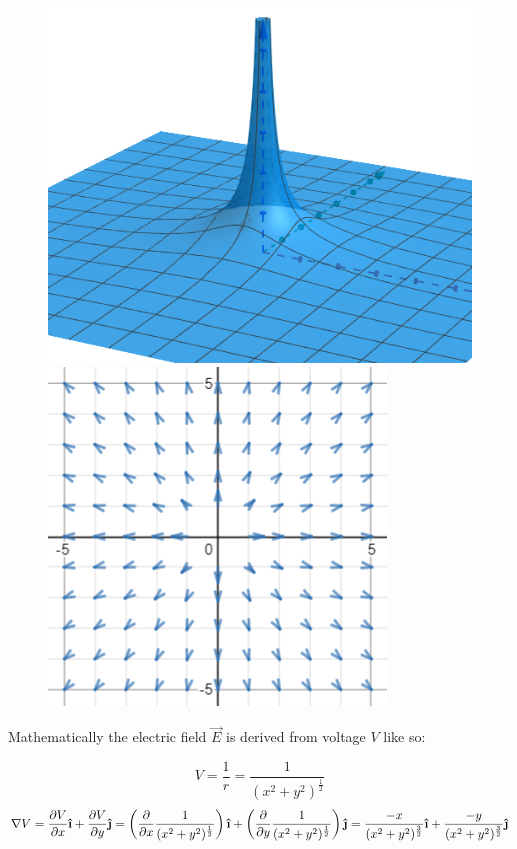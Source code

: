 \documentclass[11pt]{article}
\newcommand{\ihat}{\boldsymbol{\hat{\textbf{\i}}}}
\newcommand{\jhat}{\boldsymbol{\hat{\textbf{\j}}}}
\begin{document}
\begin{figure}[h]
\centering
\includegraphics[scale=0.57]{voltagepart1}
\includegraphics[scale=.75]{voltagepart2}
\end{figure}

Mathematically the electric field $\vec{E}$ is derived from voltage $V$ like so:

$$V = \frac{1}{r} = \frac{1}{(x^2+y^2)^{\frac{1}{2}}}$$
$$\nabla V = \pdv{V}{x}\ihat + \pdv{V}{y}\jhat = \left(\pdv{}{x} \frac{1}{(x^2+y^2)^{\frac{1}{2}}}\right) \ihat + \left(\pdv{}{y} \frac{1}{(x^2+y^2)^{\frac{1}{2}}}\right) \jhat = \frac{-x}{(x^2+y^2)^\frac{3}{2}} \ihat + \frac{-y}{(x^2+y^2)^\frac{3}{2}} \jhat$$
\end{document}
